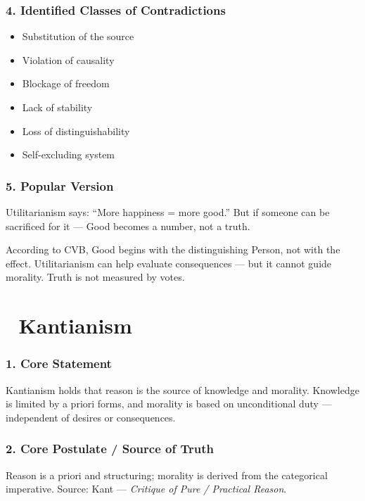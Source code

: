 \documentclass[12pt]{article}
\begin{document}
\subsubsection*{4. Identified Classes of Contradictions}

\begin{itemize}
\item Substitution of the source
\item Violation of causality
\item Blockage of freedom
\item Lack of stability
\item Loss of distinguishability
\item Self-excluding system
\end{itemize}

\subsubsection*{5. Popular Version}

Utilitarianism says: ``More happiness = more good.'' But if someone can be sacrificed for it — Good becomes a number, not a truth.

According to CVB, Good begins with the distinguishing Person, not with the effect. Utilitarianism can help evaluate consequences — but it cannot guide morality. Truth is not measured by votes.

\section*{🔷 Kantianism}

\subsubsection*{1. Core Statement}

Kantianism holds that reason is the source of knowledge and morality. Knowledge is limited by a priori forms, and morality is based on unconditional duty — independent of desires or consequences.

\subsubsection*{2. Core Postulate / Source of Truth}

Reason is a priori and structuring; morality is derived from the categorical imperative. Source: Kant — \textit{Critique of Pure / Practical Reason}.
\end{document}

